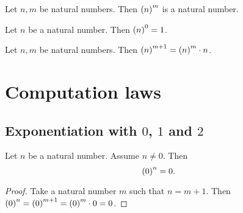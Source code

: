 \documentclass[../arithmetic.tex]{subfiles}
\begin{document}
  \begin{forthel}
    \begin{lemma}
      Let $n, m$ be natural numbers.
      Then $\left(n\right)^{m}$ is a natural number.
    \end{lemma}
  \end{forthel}

  \begin{forthel}
    \begin{lemma}
      Let $n$ be a natural number.
      Then $\left(n\right)^{0} = 1$.
    \end{lemma}
  \end{forthel}

  \begin{forthel}
    \begin{lemma}
      Let $n, m$ be natural numbers.
      Then $\left(n\right)^{m + 1} = \left(n\right)^{m} \cdot n$.
    \end{lemma}
  \end{forthel}


  \section{Computation laws}

  \subsection*{Exponentiation with $0$, $1$ and $2$}

  \begin{forthel}
    \begin{proposition}
      Let $n$ be a natural number.
      Assume $n \neq 0$.
      Then \[ \left(0\right)^{n} = 0. \]
    \end{proposition}
    \begin{proof}
      Take a natural number $m$ such that $n = m \plus 1$.
      Then $\left(0\right)^{n}
        = \left(0\right)^{m + 1}
        = \left(0\right)^{m} \cdot 0
        = 0$.
    \end{proof}
  \end{forthel}
\end{document}
